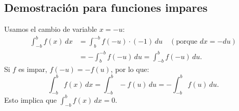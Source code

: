 \documentclass[12pt,a4paper]{article}
\begin{document}
\subsection*{Demostración para funciones impares}
Usamos el cambio de variable $x = -u$:
\begin{align*}
    \int_{-b}^{b} f(x) \, dx &= \int_{b}^{-b} f(-u) \cdot (-1) \, du \quad (\text{porque } dx = -du) \\
    &= -\int_{b}^{-b} f(-u) \, du = \int_{-b}^{b} f(-u) \, du.
\end{align*}
Si $f$ es impar, $f(-u) = -f(u)$, por lo que:
\[
\int_{-b}^{b} f(x) \, dx = \int_{-b}^{b} -f(u) \, du = -\int_{-b}^{b} f(u) \, du.
\]
Esto implica que $\displaystyle \int_{-b}^{b} f(x) \, dx = 0$.

\end{document}
